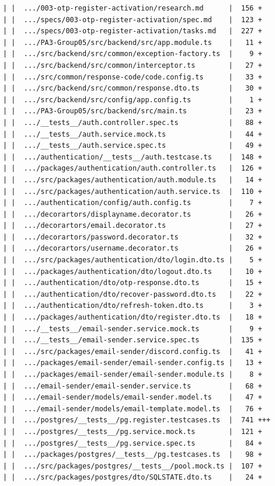 \documentclass[12pt]{article}
\begin{document}
\begin{lstlisting}[numbers=none,breaklines=true]
| |  .../003-otp-register-activation/research.md      |  156 +
| |  .../specs/003-otp-register-activation/spec.md    |  123 +
| |  .../specs/003-otp-register-activation/tasks.md   |  227 +
| |  .../PA3-Group05/src/backend/src/app.module.ts    |   11 +
| |  .../src/backend/src/common/exception-factory.ts  |    9 +
| |  .../src/backend/src/common/interceptor.ts        |   27 +
| |  .../src/common/response-code/code.config.ts      |   33 +
| |  .../src/backend/src/common/response.dto.ts       |   30 +
| |  .../src/backend/src/config/app.config.ts         |    1 +
| |  .../PA3-Group05/src/backend/src/main.ts          |   23 +
| |  .../__tests__/auth.controller.spec.ts            |   88 +
| |  .../__tests__/auth.service.mock.ts               |   44 +
| |  .../__tests__/auth.service.spec.ts               |   49 +
| |  .../authentication/__tests__/auth.testcase.ts    |  148 +
| |  .../packages/authentication/auth.controller.ts   |  126 +
| |  .../src/packages/authentication/auth.module.ts   |   14 +
| |  .../src/packages/authentication/auth.service.ts  |  110 +
| |  .../authentication/config/auth.config.ts         |    7 +
| |  .../decorartors/displayname.decorator.ts         |   26 +
| |  .../decorartors/email.decorator.ts               |   27 +
| |  .../decorartors/password.decorator.ts            |   32 +
| |  .../decorartors/username.decorator.ts            |   26 +
| |  .../src/packages/authentication/dto/login.dto.ts |    5 +
| |  .../packages/authentication/dto/logout.dto.ts    |   10 +
| |  .../authentication/dto/otp-response.dto.ts       |   15 +
| |  .../authentication/dto/recover-password.dto.ts   |   22 +
| |  .../authentication/dto/refresh-token.dto.ts      |    3 +
| |  .../packages/authentication/dto/register.dto.ts  |   18 +
| |  .../__tests__/email-sender.service.mock.ts       |    9 +
| |  .../__tests__/email-sender.service.spec.ts       |  135 +
| |  .../src/packages/email-sender/discord.config.ts  |   41 +
| |  .../packages/email-sender/email-sender.config.ts |   13 +
| |  .../packages/email-sender/email-sender.module.ts |    8 +
| |  .../email-sender/email-sender.service.ts         |   68 +
| |  .../email-sender/models/email-sender.model.ts    |   47 +
| |  .../email-sender/models/email-template.model.ts  |   76 +
| |  .../postgres/__tests__/pg.register.testcases.ts  |  741 +++
| |  .../postgres/__tests__/pg.service.mock.ts        |  121 +
| |  .../postgres/__tests__/pg.service.spec.ts        |   84 +
| |  .../packages/postgres/__tests__/pg.testcases.ts  |   98 +
| |  .../src/packages/postgres/__tests__/pool.mock.ts |  107 +
| |  .../src/packages/postgres/dto/SQLSTATE.dto.ts    |   24 +

\end{lstlisting}
\end{document}
